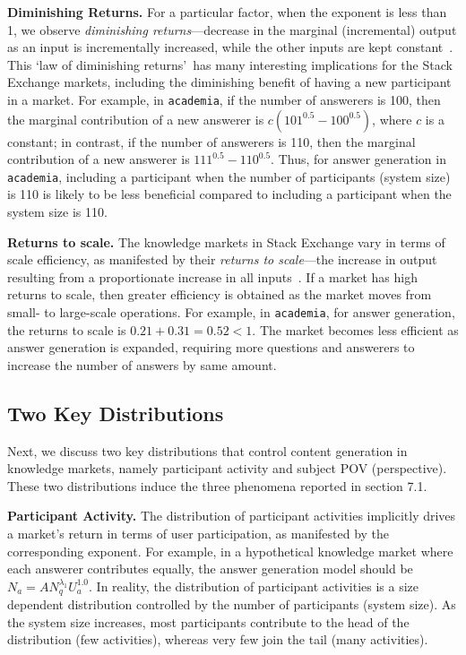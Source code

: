 \textbf{Diminishing Returns.} For a particular factor, when the exponent is less than 1, we observe \emph{diminishing returns}---decrease in the marginal (incremental) output as an input is incrementally increased, while the other inputs are kept constant~\cite{wiki}. This \lq law of diminishing returns\rq\ has many interesting implications for the Stack Exchange markets, including the diminishing benefit of having a new participant in a market. For example, in \texttt{academia}, if the number of answerers is 100, then the marginal contribution of a new answerer is $c(101^{0.5} - 100^{0.5})$, where $c$ is a constant; in contrast, if the number of answerers is 110, then the marginal contribution of a new answerer is $111^{0.5} - 110^{0.5}$. Thus, for answer generation in \texttt{academia}, including a participant when the number of participants (system size) is 110 is likely to be less beneficial compared to including a participant when the system size is 110.

\textbf{Returns to scale.} The knowledge markets in Stack Exchange vary in terms of scale efficiency, as manifested by their \emph{returns to scale}---the increase in output resulting from a proportionate increase in all inputs~\cite{wiki}. If a market has high returns to scale, then greater efficiency is obtained as the market moves from small- to large-scale operations. For example, in \texttt{academia}, for answer generation, the returns to scale is $0.21+0.31=0.52<1$. The market becomes less efficient as answer generation is expanded, requiring more questions and answerers to increase the number of answers by same amount. 

\subsection{Two Key Distributions} 
Next, we discuss two key distributions that control content generation in knowledge markets, namely participant activity and subject POV (perspective). These two distributions induce the three phenomena reported in section 7.1. 

\textbf{Participant Activity.} The distribution of participant activities implicitly drives a market's return in terms of user participation, as manifested by the corresponding exponent. For example, in a hypothetical knowledge market where each answerer contributes equally, the answer generation model should be $N_a = AN_q^{\lambda_1}U_a^{1.0}$. In reality, the distribution of participant activities is a size dependent distribution controlled by the number of participants (system size). As the system size increases, most participants contribute to the head of the distribution (few activities), whereas very few join the tail (many activities). 

